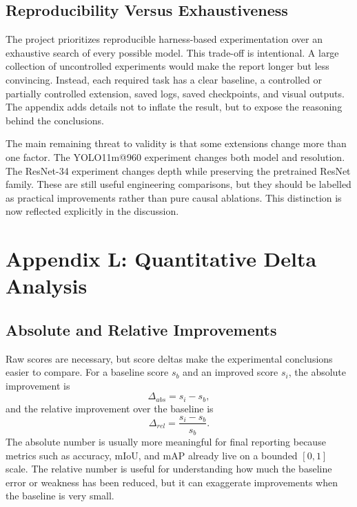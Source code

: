 \documentclass[10pt,twocolumn]{article}
\begin{document}
\subsection{Reproducibility Versus Exhaustiveness}

The project prioritizes reproducible harness-based experimentation over an exhaustive search of every possible model. This trade-off is intentional. A large collection of uncontrolled experiments would make the report longer but less convincing. Instead, each required task has a clear baseline, a controlled or partially controlled extension, saved logs, saved checkpoints, and visual outputs. The appendix adds details not to inflate the result, but to expose the reasoning behind the conclusions.

The main remaining threat to validity is that some extensions change more than one factor. The YOLO11m@960 experiment changes both model and resolution. The ResNet-34 experiment changes depth while preserving the pretrained ResNet family. These are still useful engineering comparisons, but they should be labelled as practical improvements rather than pure causal ablations. This distinction is now reflected explicitly in the discussion.

\section{Appendix L: Quantitative Delta Analysis}

\subsection{Absolute and Relative Improvements}

Raw scores are necessary, but score deltas make the experimental conclusions easier to compare. For a baseline score $s_b$ and an improved score $s_i$, the absolute improvement is
\begin{equation}
\Delta_{abs}=s_i-s_b,
\end{equation}
and the relative improvement over the baseline is
\begin{equation}
\Delta_{rel}=\frac{s_i-s_b}{s_b}.
\end{equation}
The absolute number is usually more meaningful for final reporting because metrics such as accuracy, mIoU, and mAP already live on a bounded $[0,1]$ scale. The relative number is useful for understanding how much the baseline error or weakness has been reduced, but it can exaggerate improvements when the baseline is very small.
\end{document}
